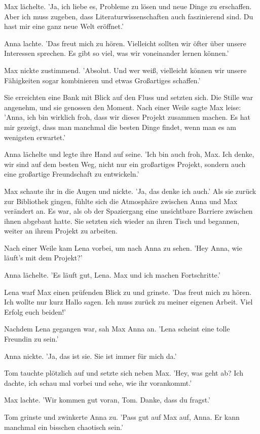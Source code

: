 \documentclass[12pt]{article}
\begin{document}
Max lächelte. 'Ja, ich liebe es, Probleme zu lösen und neue Dinge zu erschaffen. Aber ich muss zugeben, dass Literaturwissenschaften auch faszinierend sind. Du hast mir eine ganz neue Welt eröffnet.'

Anna lachte. 'Das freut mich zu hören. Vielleicht sollten wir öfter über unsere Interessen sprechen. Es gibt so viel, was wir voneinander lernen können.'

Max nickte zustimmend. 'Absolut. Und wer weiß, vielleicht können wir unsere Fähigkeiten sogar kombinieren und etwas Großartiges schaffen.'

Sie erreichten eine Bank mit Blick auf den Fluss und setzten sich. Die Stille war angenehm, und sie genossen den Moment. Nach einer Weile sagte Max leise: 'Anna, ich bin wirklich froh, dass wir dieses Projekt zusammen machen. Es hat mir gezeigt, dass man manchmal die besten Dinge findet, wenn man es am wenigsten erwartet.'

Anna lächelte und legte ihre Hand auf seine. 'Ich bin auch froh, Max. Ich denke, wir sind auf dem besten Weg, nicht nur ein großartiges Projekt, sondern auch eine großartige Freundschaft zu entwickeln.'

Max schaute ihr in die Augen und nickte. 'Ja, das denke ich auch.' Als sie zurück zur Bibliothek gingen, fühlte sich die Atmosphäre zwischen Anna und Max verändert an. Es war, als ob der Spaziergang eine unsichtbare Barriere zwischen ihnen abgebaut hatte. Sie setzten sich wieder an ihren Tisch und begannen, weiter an ihrem Projekt zu arbeiten.

Nach einer Weile kam Lena vorbei, um nach Anna zu sehen. 'Hey Anna, wie läuft's mit dem Projekt?'

Anna lächelte. 'Es läuft gut, Lena. Max und ich machen Fortschritte.'

Lena warf Max einen prüfenden Blick zu und grinste. 'Das freut mich zu hören. Ich wollte nur kurz Hallo sagen. Ich muss zurück zu meiner eigenen Arbeit. Viel Erfolg euch beiden!'

Nachdem Lena gegangen war, sah Max Anna an. 'Lena scheint eine tolle Freundin zu sein.'

Anna nickte. 'Ja, das ist sie. Sie ist immer für mich da.'

Tom tauchte plötzlich auf und setzte sich neben Max. 'Hey, was geht ab? Ich dachte, ich schau mal vorbei und sehe, wie ihr vorankommt.'

Max lachte. 'Wir kommen gut voran, Tom. Danke, dass du fragst.'

Tom grinste und zwinkerte Anna zu. 'Pass gut auf Max auf, Anna. Er kann manchmal ein bisschen chaotisch sein.'
\end{document}
